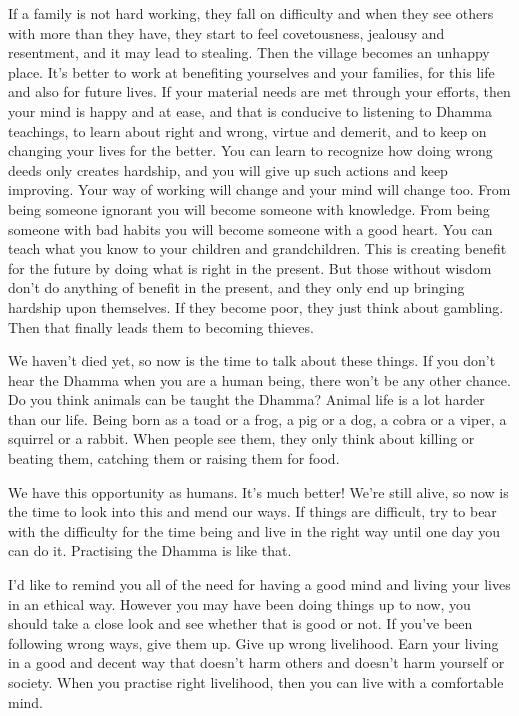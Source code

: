 If a family is not hard working, they fall on difficulty and when they see others with more than they have, they start to feel covetousness, jealousy and resentment, and it may lead to stealing. Then the village becomes an unhappy place. It's better to work at benefiting yourselves and your families, for this life and also for future lives. If your material needs are met through your efforts, then your mind is happy and at ease, and that is conducive to listening to Dhamma teachings, to learn about right and wrong, virtue and demerit, and to keep on changing your lives for the better. You can learn to recognize how doing wrong deeds only creates hardship, and you will give up such actions and keep improving. Your way of working will change and your mind will change too. From being someone ignorant you will become someone with knowledge. From being someone with bad habits you will become someone with a good heart. You can teach what you know to your children and grandchildren. This is creating benefit for the future by doing what is right in the present. But those without wisdom don't do anything of benefit in the present, and they only end up bringing hardship upon themselves. If they become poor, they just think about gambling. Then that finally leads them to becoming thieves. 

We haven't died yet, so now is the time to talk about these things. If you don't hear the Dhamma when you are a human being, there won't be any other chance. Do you think animals can be taught the Dhamma? Animal life is a lot harder than our life. Being born as a toad or a frog, a pig or a dog, a cobra or a viper, a squirrel or a rabbit. When people see them, they only think about killing or beating them, catching them or raising them for food. 

We have this opportunity as humans. It's much better! We're still alive, so now is the time to look into this and mend our ways. If things are difficult, try to bear with the difficulty for the time being and live in the right way until one day you can do it. Practising the Dhamma is like that. 

I'd like to remind you all of the need for having a good mind and living your lives in an ethical way. However you may have been doing things up to now, you should take a close look and see whether that is good or not. If you've been following wrong ways, give them up. Give up wrong livelihood. Earn your living in a good and decent way that doesn't harm others and doesn't harm yourself or society. When you practise right livelihood, then you can live with a comfortable mind. 

